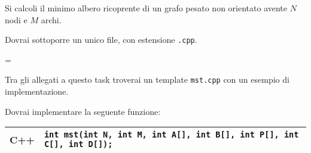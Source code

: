 \usepackage{xcolor}
\usepackage{afterpage}
\usepackage{pifont,mdframed}
\usepackage[bottom]{footmisc}

\usepackage{amsmath}
\usepackage{amsthm}
\usepackage{amssymb}
\usepackage{mathtools}



\newcommand{\inputfile}{\texttt{stdin}}
\newcommand{\outputfile}{\texttt{stdout}}

\newenvironment{warning}
  {\par\begin{mdframed}[linewidth=2pt,linecolor=gray]%
    \begin{list}{}{\leftmargin=1cm
                   \labelwidth=\leftmargin}\item[\Large\ding{43}]}
  {\end{list}\end{mdframed}\par}



Si calcoli il minimo albero ricoprente di un grafo pesato non orientato avente $N$ nodi e $M$ archi.



\Implementation

Dovrai sottoporre un unico file, con estensione \texttt{.cpp}.

\begin{warning}
Tra gli allegati a questo task troverai un template \texttt{mst.cpp} con un esempio di implementazione.
\end{warning}

Dovrai implementare la seguente funzione:

\begin{center}\begin{tabularx}{\textwidth}{|c|X|}
\hline
C++  & \verb|int mst(int N, int M, int A[], int B[], int P[], int C[], int D[]);|\\
\hline
\end{tabularx}\end{center}

